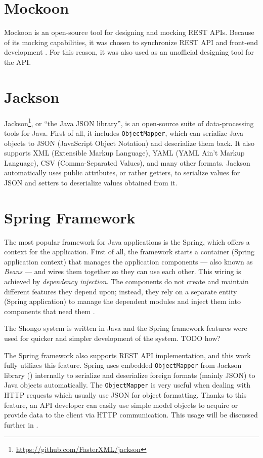 \section{Mockoon} \label{sec:mockoon}
Mockoon is an open-source tool for designing and mocking REST APIs.
Because of its mocking capabilities, it was chosen to synchronize REST API and front-end development \cite{drobnakm}.
For this reason, it was also used as an unofficial designing tool for the API.


\section{Jackson} \label{sec:jackson}
Jackson\footnote{\url{https://github.com/FasterXML/jackson}}, or \enquote{the Java JSON library}, is an open-source suite of data-processing tools for Java. First of all, it includes \texttt{ObjectMapper}, which can serialize Java objects to JSON (JavaScript Object Notation) and deserialize them back.
It also supports XML (Extensible Markup Language), YAML (YAML Ain't Markup Language), CSV (Comma-Separated Values), and many other formats.
Jackson automatically uses public attributes, or rather getters, to serialize values for JSON and setters to deserialize values obtained from it.


\section{Spring Framework} \label{sec:spring}
The most popular framework for Java applications is the Spring, which offers a context for the application.
First of all, the framework starts a container (Spring application context) that manages the application components --- also known as \emph{Beans} --- and wires them together so they can use each other. This wiring is achieved by \emph{dependency injection}.
The components do not create and maintain different features they depend upon; instead, they rely on a separate entity (Spring application) to manage the dependent modules and inject them into components that need them \cite{walls2022spring}.

The Shongo system is written in Java and the Spring framework features were used for quicker and simpler development of the system. TODO how?

The Spring framework also supports REST API implementation, and this work fully utilizes this feature.
Spring uses embedded \texttt{ObjectMapper} from Jackson library () internally to serialize and deserialize foreign formats (mainly JSON) to Java objects automatically. The \texttt{ObjectMapper} is very useful when dealing with HTTP requests which usually use JSON for object formatting. Thanks to this feature, an API developer can easily use simple model objects to acquire or provide data to the client via HTTP communication.
This usage will be discussed further in .



